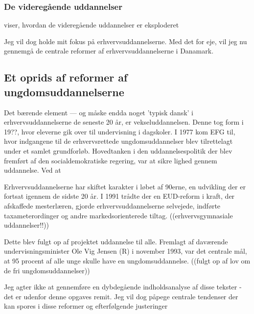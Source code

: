 \subsubsection{De videregående uddannelser}
\autocite{schoferWorldwideExpansionHigher2005} viser, hvordan de videregående uddannelser er eksploderet 

Jeg vil dog holde mit fokus på erhvervsuddannelserne.
Med det for eje, vil jeg nu gennemgå de centrale reformer af erhvervsuddannelserne i Danamark.
\subsection{Et oprids af reformer af ungdomsuddannelserne}
Det bærende element --- og måske endda noget 'typisk dansk' i erhvervsuddannelserne de seneste 20 år, er vekseluddannelsen.
Denne tog form i 19??, hvor eleverne gik over til undervisning i dagskoler.
I 1977 kom EFG til, hvor indgangene til de erhvervsrettede ungdomsuddannelser blev tilrettelagt under et samlet grundforløb.
Hovedtanken i den uddannelsespolitik der blev fremført af den socialdemokratiske regering, var at sikre lighed gennem uddannelse.
Ved at 

Erhvervsuddannelserne har skiftet karakter i løbet af 90erne, en udvikling der er fortsat igennem de sidste 20 år.
I 1991 trådte der en EUD-reform i kraft, der afskaffede mesterlæren, gjorde erhvervsuddannelserne selvejede, indførte taxameterordinger og andre markedsorienterede tiltag.
((erhvervsgymnasiale uddannelser!!))


Dette blev fulgt op af projektet uddannelse til alle.
Fremlagt af daværende undervisningsminister Ole Vig Jensen (R) i november 1993, var det centrale mål, at 95 procent af alle unge skulle have en ungdomsuddannelse.
((fulgt op af lov om de fri ungdomsuddannelser))

Jeg agter ikke at gennemføre en dybdegående indholdsanalyse af disse tekster - det er udenfor denne opgaves remit.
Jeg vil dog påpege centrale tendenser der kan spores i disse reformer og efterfølgende justeringer
